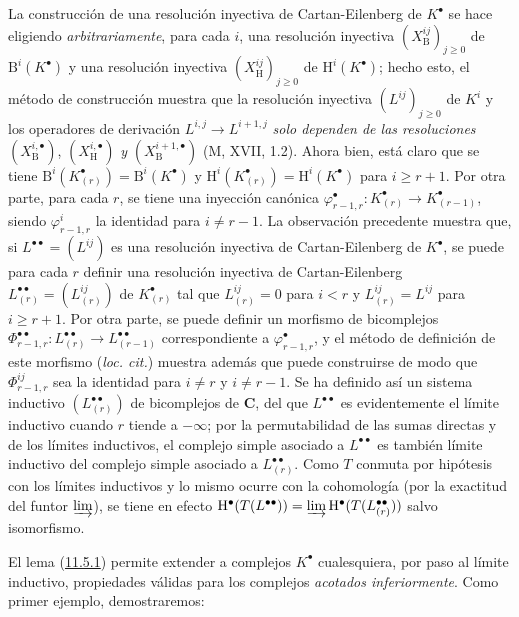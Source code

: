 La construcción de una resolución inyectiva de Cartan-Eilenberg de $K^\bullet$ se hace eligiendo \emph{arbitrariamente}, para cada $i$, una resolución inyectiva $(X_{\mathrm B}^{ij})_{j\geq0}$ de $\mathrm B^i(K^\bullet)$ y una resolución inyectiva $(X_{\mathrm H}^{ij})_{j\geq0}$ de $\mathrm H^i(K^\bullet)$; hecho esto, el método de construcción muestra que la resolución inyectiva $(L^{ij})_{j\geq0}$ de $K^i$ y los operadores de derivación $L^{i,j}\to L^{i+1,j}$ \emph{solo dependen de las resoluciones} $(X_{\mathrm B}^{i,\bullet})$, $(X_{\mathrm H}^{i,\bullet})$ \emph{y} $(X_{\mathrm B}^{i+1,\bullet})$ (M, XVII, 1.2). Ahora bien, está claro que se tiene $\mathrm B^i(K_{(r)}^\bullet)=\mathrm B^i(K^\bullet)$ y $\mathrm H^i(K_{(r)}^\bullet)=\mathrm H^i(K^\bullet)$ para $i\geq r+1$. Por otra parte, para cada $r$, se tiene una inyección canónica $\varphi_{r-1,r}^\bullet:K_{(r)}^\bullet\to K_{(r-1)}^\bullet$, siendo $\varphi_{r-1,r}^i$ la identidad para $i\neq r-1$. La observación precedente muestra que, si $L^{\bullet\bullet}=(L^{ij})$ es una resolución inyectiva de Cartan-Eilenberg de $K^\bullet$, se puede para cada $r$ definir una resolución inyectiva de Cartan-Eilenberg $L_{(r)}^{\bullet\bullet}=(L_{(r)}^{ij})$ de $K_{(r)}^\bullet$ tal que $L_{(r)}^{ij}=0$ para $i<r$ y $L_{(r)}^{ij}=L^{ij}$ para $i\geq r+1$. Por otra parte, se puede definir un morfismo de bicomplejos $\Phi_{r-1,r}^{\bullet\bullet}:L_{(r)}^{\bullet\bullet}\to
L_{(r-1)}^{\bullet\bullet}$ correspondiente a $\varphi_{r-1,r}^\bullet$, y el método de definición de este morfismo (\emph{loc. cit.}) muestra además que puede construirse de modo que $\Phi_{r-1,r}^{ij}$ sea la identidad para $i\neq r$ y $i\neq r-1$. Se ha definido así un sistema inductivo $(L_{(r)}^{\bullet\bullet})$ de bicomplejos de $\boldsymbol{C}$, del que $L^{\bullet\bullet}$ es evidentemente el límite inductivo cuando $r$ tiende a $-\infty$; por la permutabilidad de las sumas directas y de los límites inductivos, el complejo simple asociado a $L^{\bullet\bullet}$ es también límite inductivo del complejo simple asociado a $L_{(r)}^{\bullet\bullet}$. Como $T$ conmuta por hipótesis con los límites inductivos y lo mismo ocurre con la cohomología (por la exactitud del funtor $\varinjlim$), se tiene en efecto $\mathrm H^\bullet(T(L^{\bullet\bullet}))=\varinjlim\mathrm H^\bullet(T(L_{(r)}^{\bullet\bullet}))$ salvo isomorfismo.

El lema (\hyperref[0.11.5.1-fr]{11.5.1}) permite extender a complejos $K^\bullet$ cualesquiera, por paso al límite inductivo, propiedades válidas para los complejos \emph{acotados inferiormente}. Como primer ejemplo, demostraremos:

